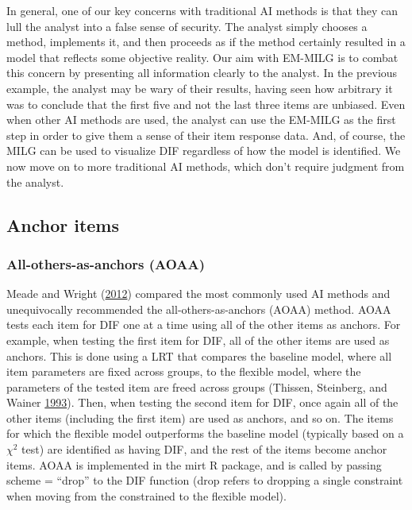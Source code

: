 \documentclass[
  11pt,
]{article}
\begin{document}
In general, one of our key concerns with traditional AI methods is that they can lull the analyst into a false sense of security. The analyst simply chooses a method, implements it, and then proceeds as if the method certainly resulted in a model that reflects some objective reality. Our aim with EM-MILG is to combat this concern by presenting all information clearly to the analyst. In the previous example, the analyst may be wary of their results, having seen how arbitrary it was to conclude that the first five and not the last three items are unbiased. Even when other AI methods are used, the analyst can use the EM-MILG as the first step in order to give them a sense of their item response data. And, of course, the MILG can be used to visualize DIF regardless of how the model is identified. We now move on to more traditional AI methods, which don't require judgment from the analyst.

\hypertarget{anchoritems}{%
\subsection{Anchor items}\label{anchoritems}}

\hypertarget{all-others-as-anchors-aoaa}{%
\subsubsection{All-others-as-anchors (AOAA)}\label{all-others-as-anchors-aoaa}}

Meade and Wright (\protect\hyperlink{ref-meade2012solving}{2012}) compared the most commonly used AI methods and unequivocally recommended the all-others-as-anchors (AOAA) method. AOAA tests each item for DIF one at a time using all of the other items as anchors. For example, when testing the first item for DIF, all of the other items are used as anchors. This is done using a LRT that compares the baseline model, where all item parameters are fixed across groups, to the flexible model, where the parameters of the tested item are freed across groups (Thissen, Steinberg, and Wainer \protect\hyperlink{ref-thissen1993detection}{1993}). Then, when testing the second item for DIF, once again all of the other items (including the first item) are used as anchors, and so on. The items for which the flexible model outperforms the baseline model (typically based on a \(\chi^2\) test) are identified as having DIF, and the rest of the items become anchor items. AOAA is implemented in the mirt R package, and is called by passing scheme = \enquote{drop} to the DIF function (drop refers to dropping a single constraint when moving from the constrained to the flexible model).
\end{document}
